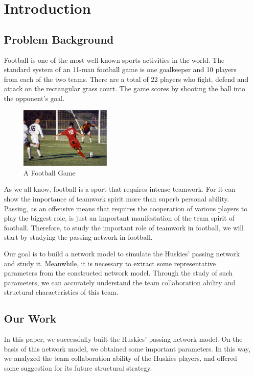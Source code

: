 \documentclass{mcmthesis}
\begin{document}
\maketitle

\tableofcontents

\newpage

\section{Introduction}
\subsection{Problem Background}
	Football is one of the most well-known sports activities in the world.  The standard system of an 11-man football game is one goalkeeper and 10 players from each of the two teams. There are a total of 22 players who fight, defend and attack on the rectangular grass court.  The game scores by shooting the ball into the opponent's goal.

	\begin{figure}[h]
		\centering
		\includegraphics[width=0.4\textwidth]{figures/football.jpg}
		\caption{A Football Game~\cite{Wiki_Football}}
		\label{fig:football}
	\end{figure}

	As we all know, football is a sport that requires intense teamwork.  For it can show the importance of teamwork spirit more than superb personal ability.  Passing, as an offensive means that requires the cooperation of various players to play the biggest role, is just an important manifestation of the team spirit of football.  Therefore, to study the important role of teamwork in football, we will start by studying the passing network in football.

	Our goal is to build a network model to simulate the Huskies' passing network and study it.  Meanwhile, it is necessary to extract some representative parameters from the constructed network model.  Through the study of such parameters, we can accurately understand the team collaboration ability and structural characteristics of this team.
\subsection{Our Work}
	In this paper, we successfully built the Huskies' passing network model.  On the basis of this network model, we obtained some important parameters. In this way, we analyzed the team collaboration ability of the Huskies players, and offered some suggestion for its future structural strategy.
\end{document}

